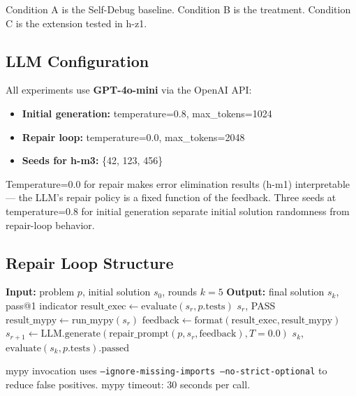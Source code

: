 Condition A is the Self-Debug baseline. Condition B is the treatment.
Condition C is the extension tested in h-z1.

\subsection{LLM Configuration}

All experiments use \textbf{GPT-4o-mini} via the OpenAI API:

\begin{itemize}
\item \textbf{Initial generation:} temperature=0.8, max\_tokens=1024
\item \textbf{Repair loop:} temperature=0.0, max\_tokens=2048
\item \textbf{Seeds for h-m3:} \{42, 123, 456\}
\end{itemize}

Temperature=0.0 for repair makes error elimination results (h-m1) interpretable
--- the LLM's repair policy is a fixed function of the feedback. Three seeds at
temperature=0.8 for initial generation separate initial solution randomness from
repair-loop behavior.

\subsection{Repair Loop Structure}

\begin{algorithm}[t]
\caption{Execution+mypy Repair Loop (Condition B)}
\label{alg:repair}
\begin{algorithmic}[1]
\STATE \textbf{Input:} problem $p$, initial solution $s_0$, rounds $k=5$
\STATE \textbf{Output:} final solution $s_k$, pass@1 indicator
  \STATE $\text{result\_exec} \leftarrow \text{evaluate}(s_r, p.\text{tests})$
    \RETURN $s_r$, PASS
  \ENDIF
  \STATE $\text{result\_mypy} \leftarrow \text{run\_mypy}(s_r)$ 
  \STATE $\text{feedback} \leftarrow \text{format}(\text{result\_exec}, \text{result\_mypy})$
  \STATE $s_{r+1} \leftarrow \text{LLM.generate}(\text{repair\_prompt}(p, s_r, \text{feedback}), T{=}0.0)$
\ENDFOR
\RETURN $s_k$, $\text{evaluate}(s_k, p.\text{tests}).\text{passed}$
\end{algorithmic}
\end{algorithm}

mypy invocation uses \texttt{--ignore-missing-imports --no-strict-optional} to
reduce false positives. mypy timeout: 30 seconds per call.

